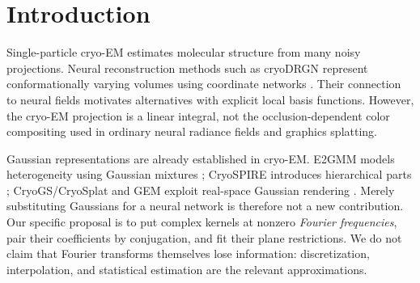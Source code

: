 \documentclass{article}
\begin{document}
\printAffiliationsAndNotice{}
\begin{abstract}
We investigate a direct Fourier-domain Gaussian representation for single-particle cryogenic electron microscopy (cryo-EM). Complex-valued Gaussian kernels are paired under conjugate reflection, enforcing the Hermitian symmetry of a real electrostatic potential. We derive the exact restriction of each anisotropic kernel to a projection plane, including its attenuation away from that plane, and incorporate contrast transfer and translations analytically. With fixed geometry, reconstruction reduces to regularized linear least squares; variable projection provides a route to learning kernel geometry. The method differs from projecting real-space Gaussian mixtures and from coordinate-network decoders. This manuscript initially records the method and evaluation protocol before experiments. Empirical results will be inserted only from completed runs; no accuracy, speed, or novelty claim is presumed.
\end{abstract}

\section{Introduction}
Single-particle cryo-EM estimates molecular structure from many noisy projections. Neural reconstruction methods such as cryoDRGN represent conformationally varying volumes using coordinate networks \citep{zhong2021}. Their connection to neural fields motivates alternatives with explicit local basis functions. However, the cryo-EM projection is a linear integral, not the occlusion-dependent color compositing used in ordinary neural radiance fields and graphics splatting.

Gaussian representations are already established in cryo-EM. E2GMM models heterogeneity using Gaussian mixtures \citep{chen2021}; CryoSPIRE introduces hierarchical parts \citep{shekar2025}; CryoGS/CryoSplat and GEM exploit real-space Gaussian rendering \citep{chen2025,qu2025}. Merely substituting Gaussians for a neural network is therefore not a new contribution. Our specific proposal is to put complex kernels at nonzero \emph{Fourier frequencies}, pair their coefficients by conjugation, and fit their plane restrictions. We do not claim that Fourier transforms themselves lose information: discretization, interpolation, and statistical estimation are the relevant approximations.
\end{document}

